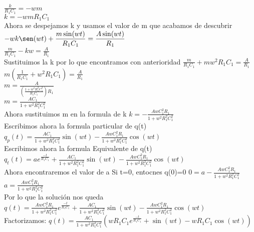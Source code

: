 \documentclass[12pt]{article}
\newcommand{\e}[1]{e^{#1}}
\newcommand{\escribir}[1]{\singlespacing#1\singlespacing}
\newcommand{\fraccion}[2]{\displaystyle\frac{#1}{#2}}
\begin{document}
	$\fraccion{k}{R_1C_1}=-wm$\\

	$k=-wmR_1C_1$\\ 

	\escribir{Ahora se despejamos k y usamos el valor de m que acabamos de descubrir}
	$-wk\sen(wt)+\fraccion{m\sin(wt)}{R_1C_1}=\fraccion{A\sin(wt)}{R_1}$\\

	$\fraccion{m}{R_1C_1}-kw=\fraccion{A}{R_1}$\\
	\escribir{Sustituimos la k por lo que encontramos con anterioridad}
	$\fraccion{m}{R_1C_1}+mw^2R_1C_1=\fraccion{A}{R_1}$\\

	$m(\fraccion{1}{R_1C_1}+w^2R_1C_1)=\fraccion{A}{R_1}$\\

	$m=\fraccion{A}{(\fraccion{1+w^2R_1^2C_1^2}{R_1C_1})R_1}$\\

	$m=\fraccion{AC_1}{1+w^2R_1^2C_1^2}$\\
	
	\escribir{Ahora sustituimos m en la formula de k}
	$k=-\fraccion{AwC_1^2R_1}{1+w^2R_1^2C_1^2}$\\

	\escribir{Escribimos ahora la formula particular de q(t)}
	$q_p(t)=\fraccion{AC_1}{1+w^2R_1^2C_1^2}\sin(wt)-\fraccion{AwC_1^2R_1}{1+w^2R_1^2C_1^2}\cos(wt)$\\

	\escribir{Escribimos ahora la formula Equivalente de q(t)}
	$q_t(t)=a\e{\frac{-t}{R_1C_1}}+\fraccion{AC_1}{1+w^2R_1^2C_1^2}\sin(wt)-\fraccion{AwC_1^2R_1}{1+w^2R_1^2C_1^2}\cos(wt)$\\
	
	\escribir{Ahora encontraremos el valor de a}
	\escribir{Si t=0, entocnes q(0)=0}
	$0=a-\fraccion{AwC_1^2R_1}{1+w^2R_1^2C_1^2}$\\
	
	$a=\fraccion{AwC_1^2R_1}{1+w^2R_1^2C_1^2}$\\

	\escribir{Por lo que la solución nos queda}
	$q(t)=\fraccion{AwC_1^2R_1}{1+w^2R_1^2C_1^2}\e{\frac{-t}{R_1C_1}}+\fraccion{AC_1}{1+w^2R_1^2C_1^2}\sin(wt)-\fraccion{AwC_1^2R_1}{1+w^2R_1^2C_1^2}\cos(wt)$\\

	\escribir{Factorizamos:}
	$q(t)=\fraccion{AC_1}{1+w^2R_1^2C_1^2}(wR_1C_1\e{\frac{-t}{R_1C_1}}+\sin(wt)-wR_1C_1\cos(wt))$\\
\end{document}
